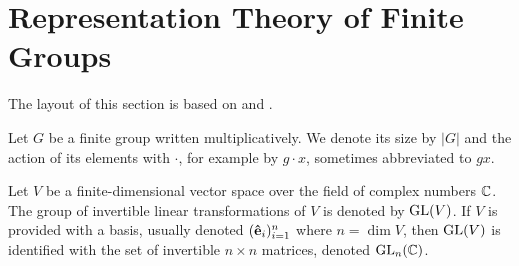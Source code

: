 \clearpage{\thispagestyle{empty}}
\section{Representation Theory of Finite Groups}

The layout of this section is based on \cite{FultonHarris} and \cite{Serre}.

Let $G$ be a finite group written multiplicatively. We denote its size by $|G|$ and the action of its elements with $\cdot$, for example by $g \cdot x$, sometimes abbreviated to $gx$.

Let $V$ be a finite-dimensional vector space over the field of complex numbers $\mathbb{C}$. The group of invertible linear transformations of $V$ is denoted by $\text{GL}(V)$. If $V$ is provided with a basis, usually denoted $(\mathbf{\hat{e}}_i)_{i=1}^n$ where $n = \dim V$, then $\text{GL}(V)$ is identified with the set of invertible $n \times n$ matrices, denoted $\text{GL}_n(\mathbb{C})$\cite[18.1]{DummitFoote}.


